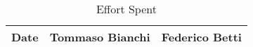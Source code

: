 \begin{table}[H]	
	\centering
	\def\arraystretch{1.25}
	\begin{tabular}{|m{5cm}|m{5cm}|m{5cm}|}
		\hline
		\textbf{Date} & \textbf{Tommaso Bianchi} &  \textbf{Federico Betti}\\ \hline
	\end{tabular}
	\caption{Effort Spent}
\end{table}

